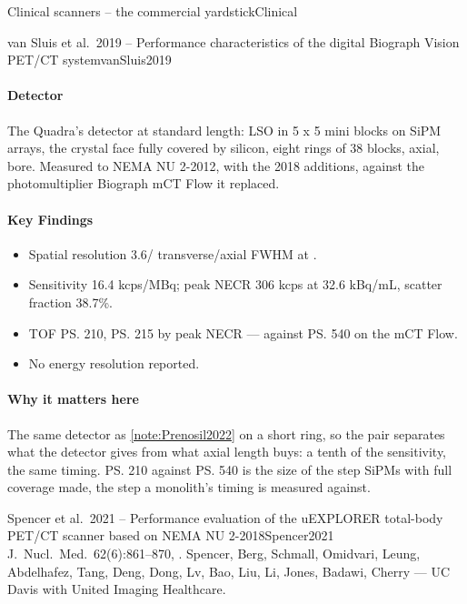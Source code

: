 \begin{programnote}{Clinical scanners -- the commercial yardstick}{Clinical}
\begin{papernote}{van Sluis et al.\ 2019 -- Performance characteristics of the digital Biograph Vision PET/CT system}{vanSluis2019}
\paragraph{Detector}
The Quadra's detector at standard length:  LSO
in 5 x 5 mini blocks on  SiPM arrays, the crystal face
fully covered by silicon, eight rings of 38 blocks,  axial, 
bore. Measured to NEMA NU 2-2012, with the 2018 additions, against the
photomultiplier Biograph mCT Flow it replaced.

\paragraph{Key Findings}
\begin{itemize}
	\item Spatial resolution 3.6/ transverse/axial FWHM at .
	\item Sensitivity 16.4 kcps/MBq; peak NECR 306 kcps at 32.6 kBq/mL,
		scatter fraction 38.7\%.
	\item TOF \ps{210}, \ps{215} by peak NECR --- against \ps{540} on the mCT
		Flow.
	\item No energy resolution reported.
\end{itemize}

\paragraph{Why it matters here}
The same detector as \ref{note:Prenosil2022} on a short ring, so the pair
separates what the detector gives from what axial length buys: a tenth of the
sensitivity, the same timing. \ps{210} against \ps{540} is the size of the step
SiPMs with full coverage made, the step a monolith's timing is measured
against.
\end{papernote}

\begin{papernote}{Spencer et al.\ 2021 -- Performance evaluation of the uEXPLORER total-body PET/CT scanner based on NEMA NU 2-2018}{Spencer2021}
J.\ Nucl.\ Med.\ 62(6):861--870, . Spencer,
Berg, Schmall, Omidvari, Leung, Abdelhafez, Tang, Deng, Dong, Lv, Bao, Liu, Li,
Jones, Badawi, Cherry --- UC Davis with United Imaging Healthcare.


\end{papernote}
\end{programnote}
